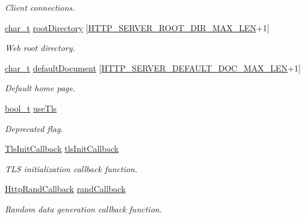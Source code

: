 \begin{DoxyCompactItemize}
\begin{DoxyCompactList}\small\item\em Client connections. \end{DoxyCompactList}\item 
\hyperlink{compiler__port_8h_a40bb5262bf908c328fbcfbe5d29d0201}{char\+\_\+t} \hyperlink{structHttpServerSettings_a969e854f1d0a2b6cc6015aa854f7c88f}{root\+Directory} \mbox{[}\hyperlink{http__server_8h_a521caa84e726cd456227c75534ca97c6}{H\+T\+T\+P\+\_\+\+S\+E\+R\+V\+E\+R\+\_\+\+R\+O\+O\+T\+\_\+\+D\+I\+R\+\_\+\+M\+A\+X\+\_\+\+L\+EN}+1\mbox{]}
\begin{DoxyCompactList}\small\item\em Web root directory. \end{DoxyCompactList}\item 
\hyperlink{compiler__port_8h_a40bb5262bf908c328fbcfbe5d29d0201}{char\+\_\+t} \hyperlink{structHttpServerSettings_a9bdbfb6cff737fd113955ed3ac74045b}{default\+Document} \mbox{[}\hyperlink{http__server_8h_a42e58ec2d2872d2ca3ca85a1ec383745}{H\+T\+T\+P\+\_\+\+S\+E\+R\+V\+E\+R\+\_\+\+D\+E\+F\+A\+U\+L\+T\+\_\+\+D\+O\+C\+\_\+\+M\+A\+X\+\_\+\+L\+EN}+1\mbox{]}
\begin{DoxyCompactList}\small\item\em Default home page. \end{DoxyCompactList}\item 
\hyperlink{compiler__port_8h_a812d16e5494522586b3784e55d479912}{bool\+\_\+t} \hyperlink{structHttpServerSettings_aa05a5b60d9277d77f713989774ca3fde}{use\+Tls}
\begin{DoxyCompactList}\small\item\em Deprecated flag. \end{DoxyCompactList}\item 
\hyperlink{http__server_8h_a8f99c4f733cd42c09edd9187bd404465}{Tls\+Init\+Callback} \hyperlink{structHttpServerSettings_a890f65c7a1d68d186e397bbd8a1622de}{tls\+Init\+Callback}
\begin{DoxyCompactList}\small\item\em T\+LS initialization callback function. \end{DoxyCompactList}\item 
\hyperlink{http__server_8h_a9f0f66dc24b0e7bc863c281081df3936}{Http\+Rand\+Callback} \hyperlink{structHttpServerSettings_aeb1efb95fab8e249ead38a9123ae8277}{rand\+Callback}
\begin{DoxyCompactList}\small\item\em Random data generation callback function. \end{DoxyCompactList}\item 

\end{DoxyCompactItemize}
